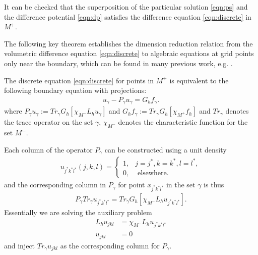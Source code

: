 It can be checked that the superposition of the particular solution \eqref{eqn:ps} and the difference potential \eqref{eqn:dp} satisfies the difference equation \eqref{eqn:discrete} in $M^+$.

The following key theorem establishes the dimension reduction relation from the volumetric difference equation \eqref{eqn:discrete} to algebraic equations at grid points only near the boundary, which can be found in many previous work, e.g. \cite{xia2023local,ryaben2006algorithm,medvinsky2012method,albright2015high,epshteyn2014algorithms,epshteyn2012upwind,epshteyn2019efficient}.
\begin{theorem}
The discrete equation \eqref{eqn:discrete} for points in $M^+$ is equivalent to the following boundary equation with projections:
\begin{align}\label{eqn:bep}
u_\gamma - P_\gamma u_\gamma = G_hf_\gamma.
\end{align}
where $P_\gamma u_\gamma:=Tr_{\gamma}G_h[\chi_{M^-}L_hu_\gamma]$ and $G_hf_\gamma:=Tr_\gamma G_h[\chi_{M^+}f_h]$ and $Tr_{\gamma}$ denotes the trace operator on the set $\gamma$, $\chi_{M^-}$ denotes the characteristic function for the set $M^-$.
\end{theorem}

Each column of the operator $P_\gamma$ can be constructed using a unit density
\begin{align}\label{eqn:unit_density}
u_{j^*k^*l^*}(j,k,l) = \left\{
\begin{array}{cc}
1,& j=j^*,k=k^*,l=l^*,\\
0,&\mbox{ elsewhere.}
\end{array}
\right.
\end{align}
and the corresponding column in $P_\gamma$ for point $x_{j^*k^*l^*}$ in the set $\gamma$ is thus
\begin{align}
P_\gamma Tr_{\gamma}u_{j^*k^*l^*}=Tr_{\gamma}G_h[\chi_{M^-}L_hu_{j^*k^*l^*}].
\end{align}
Essentially we are solving the auxiliary problem
\begin{subequations}\label{eqn:unit_finite_aux_prob}
\begin{align}
L_h u_{jkl} &= \chi_{M^-}L_hu_{j^*k^*l^*}\\
u_{jkl} &= 0 
\end{align}
\end{subequations}
and inject $Tr_{\gamma}u_{jkl}$ as the corresponding column for $P_\gamma$.

